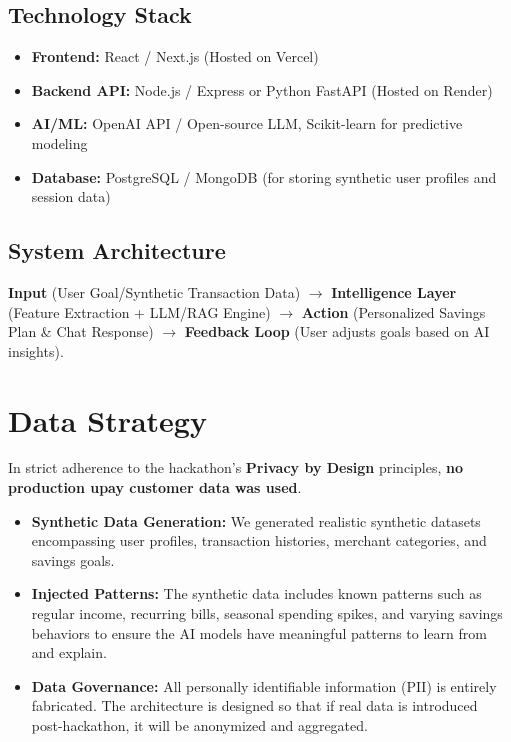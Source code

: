 \documentclass[11pt, a4paper]{article}
\begin{document}
\subsection{Technology Stack}
\begin{itemize}[leftmargin=*]
    \item \textbf{Frontend:} React / Next.js (Hosted on Vercel)
    \item \textbf{Backend API:} Node.js / Express or Python FastAPI (Hosted on Render)
    \item \textbf{AI/ML:} OpenAI API / Open-source LLM, Scikit-learn for predictive modeling
    \item \textbf{Database:} PostgreSQL / MongoDB (for storing synthetic user profiles and session data)
\end{itemize}

\subsection{System Architecture}
\textbf{Input} (User Goal/Synthetic Transaction Data) $\rightarrow$ \textbf{Intelligence Layer} (Feature Extraction + LLM/RAG Engine) $\rightarrow$ \textbf{Action} (Personalized Savings Plan \& Chat Response) $\rightarrow$ \textbf{Feedback Loop} (User adjusts goals based on AI insights).

\newpage

\section{Data Strategy}
In strict adherence to the hackathon's \textbf{Privacy by Design} principles, \textbf{no production upay customer data was used}. 
\begin{itemize}[leftmargin=*]
    \item \textbf{Synthetic Data Generation:} We generated realistic synthetic datasets encompassing user profiles, transaction histories, merchant categories, and savings goals.
    \item \textbf{Injected Patterns:} The synthetic data includes known patterns such as regular income, recurring bills, seasonal spending spikes, and varying savings behaviors to ensure the AI models have meaningful patterns to learn from and explain.
    \item \textbf{Data Governance:} All personally identifiable information (PII) is entirely fabricated. The architecture is designed so that if real data is introduced post-hackathon, it will be anonymized and aggregated.
\end{itemize}
\end{document}
